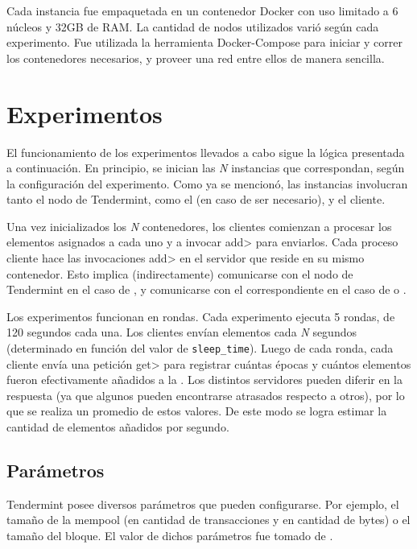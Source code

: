%
Cada instancia fue empaquetada en un contenedor Docker con uso limitado a 6 núcleos y 32GB de RAM.
%
La cantidad de nodos utilizados varió según cada experimento.
%
Fue utilizada la herramienta Docker-Compose para iniciar y correr los contenedores necesarios,
y proveer una red entre ellos de manera sencilla.


\section{Experimentos}
El funcionamiento de los experimentos llevados a cabo sigue la lógica presentada a continuación.
%
En principio, se inician las \textit{N} instancias que correspondan, según la configuración del experimento.
%
Como ya se mencionó, las instancias involucran tanto el nodo de Tendermint, como el \collector (en caso de
ser necesario), y el cliente.
%

Una vez inicializados los \textit{N} contenedores, los clientes comienzan a procesar los elementos asignados a cada
uno y a invocar \<add> para enviarlos.
%
Cada proceso cliente hace las invocaciones \<add> en el servidor que reside en su mismo contenedor. 
%
Esto implica (indirectamente) comunicarse con el nodo de Tendermint en el caso de \vanilla, y
comunicarse con el \collector correspondiente en el caso de \compresschain o \hashchain.

Los experimentos funcionan en rondas.
%
Cada experimento ejecuta 5 rondas, de 120 segundos cada una.
%
Los clientes envían elementos cada \textit{N} segundos (determinado en función del valor
de \texttt{sleep\_time}).
%
Luego de cada ronda, cada cliente envía una petición \<get> para registrar cuántas épocas y cuántos
elementos fueron efectivamente añadidos a la \setchain.
%
Los distintos servidores pueden diferir en la respuesta (ya que algunos pueden encontrarse atrasados
respecto a otros), por lo que se realiza un promedio de estos valores.
%
De este modo se logra estimar la cantidad de elementos añadidos por segundo.

\subsection{Parámetros}
Tendermint posee diversos parámetros que pueden configurarse.
Por ejemplo, el tamaño de la mempool
(en cantidad de transacciones y en cantidad de bytes) o el tamaño del bloque.
El valor de dichos parámetros fue tomado de \cite{tendermint.design}.

\bigskip

